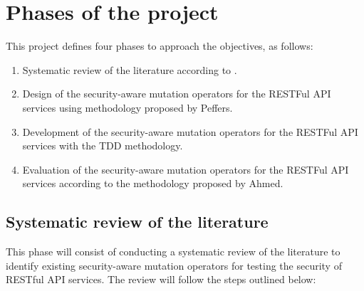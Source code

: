 \section{Phases of the project} \label{sec:phases}
This project defines four phases to approach the objectives, as follows:
  \begin{enumerate}
    \item Systematic review of the literature according to \cite{Kitchenham2002}.
    \item Design of the security-aware mutation operators for the RESTFul API services using methodology proposed by Peffers\cite{Peffers2007}.
     \item Development of the security-aware mutation operators for the RESTFul API services with the TDD methodology.
     \item Evaluation of the security-aware mutation operators for the RESTFul API services according to the methodology proposed by Ahmed\cite{Ahmed2010}.
  \end{enumerate}

\subsection{Systematic review of the literature}

This phase will consist of conducting a systematic review of the literature to identify existing security-aware mutation operators for testing the security of RESTful API services. The review will follow the steps outlined below:


